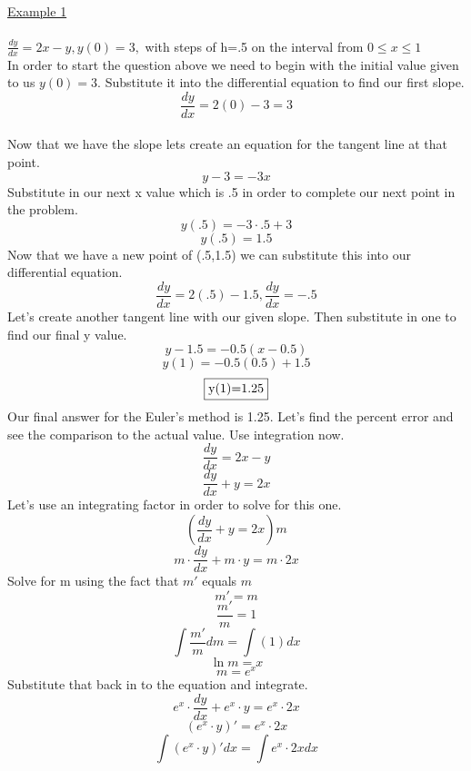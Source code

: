 \documentclass[a4paper,openright, 10pt]{article}
\begin{document}
 \\
 \underline{Example 1}\\
 \\
 $\frac{dy}{dx}=2x-y,y(0)=3,$ with steps of h=.5 on the interval from $0\leq x\leq 1$\\
 In order to start the question above we need to begin with the initial value given to us $y(0)=3$. Substitute it into the differential equation to find our first slope.
 $$\frac{dy}{dx}=2(0)-3=3$$\\
 Now that we have the slope lets create an equation for the tangent line at that point.
 $$y-3=-3x$$
 Substitute in our next x value which is .5 in order to complete our next point in the problem.
 $$y(.5)=-3\cdot.5+3$$
 $$y(.5)=1.5$$
 Now that we have a new point of (.5,1.5) we can substitute this into our differential equation.
 $$\frac{dy}{dx}=2(.5)-1.5,\frac{dy}{dx}=-.5$$
 Let's create another tangent line with our given slope. Then substitute in one to find our final y value.\\
 $$y-1.5=-0.5(x-0.5)$$
  $$y(1)=-0.5(0.5)+1.5$$
  $$\fbox{y(1)=1.25}$$
 Our final answer for the Euler's method is 1.25.
 Let's find the percent error and see the comparison to the actual value. Use integration now.\\
 $$\frac{dy}{dx}=2x-y$$
 $$\frac{dy}{dx}+y=2x$$
 Let's use an integrating factor in order to solve for this one.
 $$(\frac{dy}{dx}+y=2x)m$$
 $$m\cdot\frac{dy}{dx}+m\cdot y=m\cdot2x$$
 Solve for m using the fact that $m'$ equals $m$
 $$m'=m$$
 $$\frac{m'}{m}=1$$
  $$\int\frac{m'}{m}dm=\int(1)dx$$
  $$\ln{m}=x$$
  $$m=e^x$$
  Substitute that back in to the equation and integrate.
   $$e^x \cdot\frac{dy}{dx}+e^x \cdot y=e^x \cdot2x$$
   $$(e^x \cdot y)'=e^x \cdot2x$$
   $$\int(e^x \cdot y)'dx=\int e^x \cdot2x dx$$
   
\end{document}
